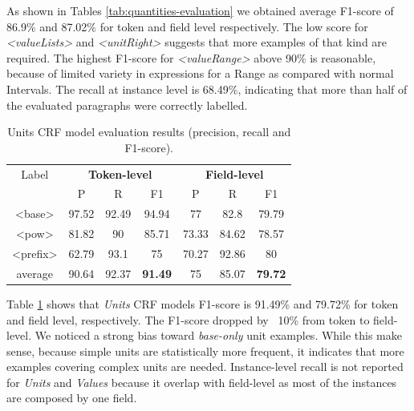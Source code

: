\documentclass[sigconf]{acmart}
\begin{document}
As shown in Tables \ref{tab:quantities-evaluation} we obtained average F1-score of 86.9\% and 87.02\% for token and field level respectively. The low score for \textit{<valueLists>} and \textit{<unitRight>} suggests that more examples of that kind are required. The highest F1-score for \textit{<valueRange>} above 90\% is reasonable, because of limited variety in expressions for a Range as compared with normal Intervals. 
The recall at instance level is 68.49\%, indicating that more than half of the evaluated paragraphs were correctly labelled.  

\begin{table}[ht]
    \caption{Units CRF model evaluation results (precision, recall and F1-score).}
    \label{tab:units-evaluation}
    \begin{tabular}{c|ccc|ccc}
        \toprule
        Label & \multicolumn{3}{c}{\textbf{Token-level}} & \multicolumn{3}{c}{\textbf{Field-level}}\\
        & P & R & F1 & P & R & F1 \\
        \midrule
        <base>    & 97.52 & 92.49 & 94.94 & 77    & 82.8  & 79.79 \\
        <pow>     & 81.82 & 90    & 85.71 & 73.33 & 84.62 & 78.57 \\
        <prefix>  & 62.79 & 93.1  & 75    & 70.27 & 92.86 & 80    \\
        \midrule
        average   & 90.64  & 92.37 & \textbf{91.49} & 75   & 85.07 & \textbf{79.72} \\
        \bottomrule
   \end{tabular}
\end{table}

Table \ref{tab:units-evaluation} shows that \textit{Units} CRF models F1-score is 91.49\% and 79.72\% for token and field level, respectively. The F1-score dropped by ~10\% from token to field-level. We noticed a strong bias toward \textit{base-only} unit examples. While this make sense, because simple units are statistically more frequent, it indicates that more examples covering complex units are needed. Instance-level recall is not reported for \textit{Units} and \textit{Values} because it overlap with field-level as most of the instances are composed by one field. 
\end{document}
